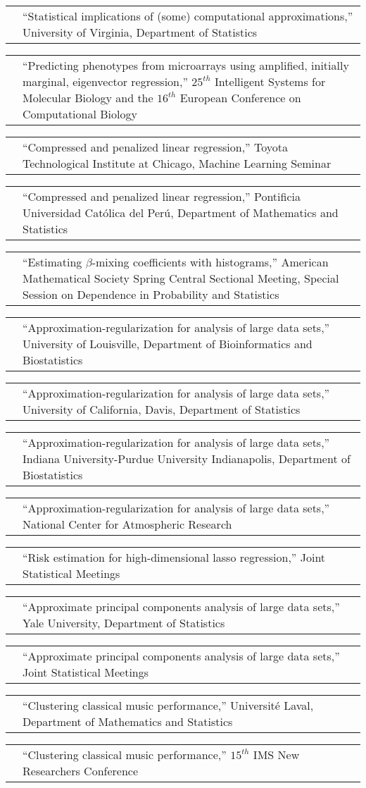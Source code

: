 \documentclass[11pt,letterpaper]{minimal/moderncv}
\makeatletter
\renewcommand*{\cvitem}[2]{%
  \begin{tabular}{@{}p{\hintscolumnwidth}@{\hspace{\separatorcolumnwidth}}%
    p{\maincolumnwidth}@{}}%
    \raggedleft {#1} &  {#2}%
  \end{tabular}%
}
\makeatother
\begin{document}
\cvitem{}{ ``Statistical implications of (some) computational approximations,'' University of Virginia, Department of
  Statistics}

\cvitem{2017}{ ``Predicting phenotypes from microarrays using amplified,
  initially marginal, eigenvector regression,'' $25^{th}$ Intelligent
  Systems for Molecular Biology and the $16^{th}$ European Conference
  on Computational Biology}

\cvitem{}{ ``Compressed and penalized linear regression,'' Toyota
  Technological Institute at Chicago, Machine Learning Seminar}

\cvitem{}{ ``Compressed and penalized linear regression,'' Pontificia
  Universidad Cat\'olica del Per\'u, Department of 
  Mathematics and Statistics}

\cvitem{}{ ``Estimating $\beta$-mixing coefficients with histograms,''
  American Mathematical Society Spring Central Sectional Meeting,
  Special Session on Dependence in Probability and Statistics}

\cvitem{2016}{ ``Approximation-regularization for analysis of large data sets,''
  University of Louisville, Department of Bioinformatics and
  Biostatistics}

\cvitem{}{ ``Approximation-regularization for analysis of large data
  sets,''  University of California, Davis, Department of Statistics}

\cvitem{}{ ``Approximation-regularization for analysis of large data
  sets,''  Indiana University-Purdue University Indianapolis, Department
  of Biostatistics}

\cvitem{}{ ``Approximation-regularization for analysis of large data
  sets,''  National Center for Atmospheric Research}

\cvitem{}{ ``Risk estimation for high-dimensional lasso regression,'' Joint
  Statistical Meetings}

\cvitem{2015}{ ``Approximate principal components analysis of large data sets,''
  Yale University, Department of Statistics}

\cvitem{2014}{ ``Approximate principal components analysis of large data sets,''
  Joint Statistical Meetings}

\cvitem{}{ ``Clustering classical music performance,''
  Universit\'e Laval, Department of Mathematics and Statistics}

\cvitem{2013}{ ``Clustering classical music performance,'' $15^{th}$ IMS New Researchers Conference}
\end{document}
